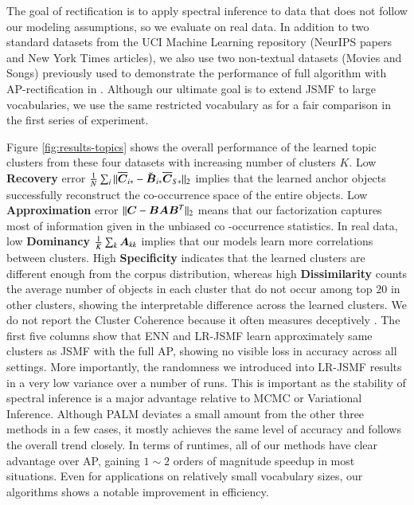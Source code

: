 The goal of rectification is to apply spectral inference to data that does not
follow our modeling assumptions, so we evaluate on real data. In addition to two
standard datasets from the UCI Machine Learning repository (NeurIPS papers and
New York Times articles), we also use two non-textual datasets (Movies and
Songs) previously used to demonstrate the performance of full algorithm with
AP-rectification in \cite{moontae2015nips}. Although our ultimate goal is to
extend JSMF to large vocabularies, we use the same restricted vocabulary as 
\cite{moontae2015nips} for a fair comparison in the first series of experiment.

Figure \ref{fig:results-topics} shows the overall performance of the learned
topic clusters from these four datasets with increasing number of clusters $K$.
Low \textbf{Recovery} error $\frac{1}{N}\sum_i\|\overline{\bm{C}}_{i\ast} - \smash{\breve{\bm{B}}}_{i\ast}
\overline{\bm{C}}_{S\ast}\|_2$ implies that the learned anchor objects successfully
reconstruct the co\hyp{}occurrence space of the entire objects. Low 
\textbf{Approximation} error $\|\bm{C}-\bm{B}\bm{A}\bm{B}^T\|_2$ means that our
factorization captures most of information given in the unbiased co
\hyp{}occurrence statistics. In real data, low \textbf{Dominancy} $\frac{1}
{K}\sum_k \bm{A}_{kk}$ implies that our models learn more correlations between
clusters. High \textbf{Specificity}  indicates that the learned clusters are
different enough from the corpus distribution, whereas high 
\textbf{Dissimilarity} counts the average number of objects in each cluster that
do not occur among top $20$ in other clusters, showing the interpretable
difference across the learned clusters. We do not report the Cluster Coherence
because it often measures deceptively \cite{chang2009reading}. The first five
columns show that ENN and LR\hyp{}JSMF learn approximately same clusters as JSMF
with the full AP, showing no visible loss in accuracy across all settings. More
importantly, the randomness we introduced into LR\hyp{}JSMF results in a very
low variance over a number of runs. This is important as the stability of
spectral inference is a major advantage relative to MCMC or Variational
Inference. Although PALM deviates a small amount from the other three methods in
a few cases, it mostly achieves the same level of accuracy and follows the
overall trend closely. In terms of runtimes, all of our methods have clear
advantage over AP, gaining $1\sim2$ orders of magnitude speedup in most
situations. Even for applications on relatively small vocabulary sizes, our
algorithms shows a notable improvement in efficiency.

